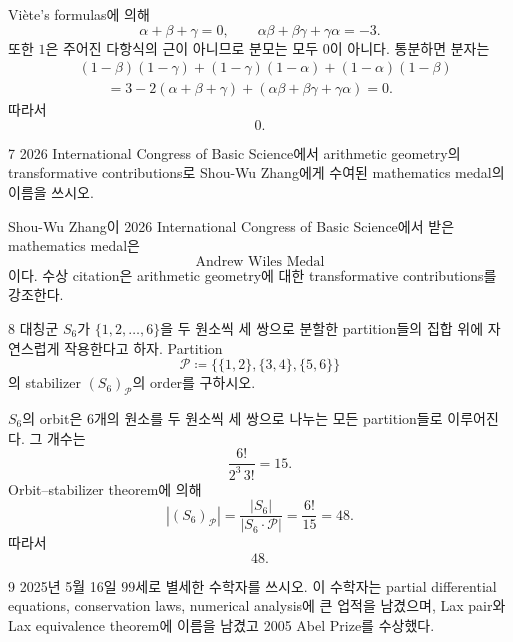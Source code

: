 \begin{solution}
Vi\`ete's formulas에 의해
\[
    \alpha+\beta+\gamma=0,
    \qquad
    \alpha\beta+\beta\gamma+\gamma\alpha=-3.
\]
또한 $1$은 주어진 다항식의 근이 아니므로 분모는 모두 $0$이 아니다. 통분하면 분자는
\[
    \begin{aligned}
        &(1-\beta)(1-\gamma)
        +(1-\gamma)(1-\alpha)
        +(1-\alpha)(1-\beta)\\
        &\qquad
        =3-2(\alpha+\beta+\gamma)
        +(\alpha\beta+\beta\gamma+\gamma\alpha)
        =0.
    \end{aligned}
\]
따라서
\[
    \boxed{0}.
\]
\end{solution}

\begin{problem}{7}
2026 International Congress of Basic Science에서 arithmetic geometry의 transformative contributions로 Shou-Wu Zhang에게 수여된 mathematics medal의 이름을 쓰시오.
\end{problem}

\begin{solution}
Shou-Wu Zhang이 2026 International Congress of Basic Science에서 받은 mathematics medal은
\[
    \boxed{\text{Andrew Wiles Medal}}
\]
이다. 수상 citation은 arithmetic geometry에 대한 transformative contributions를 강조한다.
\end{solution}

\begin{problem}{8}
대칭군 $S_6$가 $\{1,2,\ldots,6\}$을 두 원소씩 세 쌍으로 분할한 partition들의 집합 위에 자연스럽게 작용한다고 하자. Partition
\[
    \mathcal{P}
    \coloneqq
    \bigl\{\{1,2\},\{3,4\},\{5,6\}\bigr\}
\]
의 stabilizer $(S_6)_{\mathcal{P}}$의 order를 구하시오.
\end{problem}

\begin{solution}
$S_6$의 orbit은 $6$개의 원소를 두 원소씩 세 쌍으로 나누는 모든 partition들로 이루어진다. 그 개수는
\[
    \frac{6!}{2^3\,3!}=15.
\]
Orbit--stabilizer theorem에 의해
\[
    \left|(S_6)_{\mathcal{P}}\right|
    =
    \frac{|S_6|}{|S_6\cdot\mathcal{P}|}
    =
    \frac{6!}{15}
    =48.
\]
따라서
\[
    \boxed{48}.
\]
\end{solution}

\begin{problem}{9}
2025년 5월 16일 $99$세로 별세한 수학자를 쓰시오. 이 수학자는 partial differential equations, conservation laws, numerical analysis에 큰 업적을 남겼으며, Lax pair와 Lax equivalence theorem에 이름을 남겼고 2005 Abel Prize를 수상했다.
\end{problem}

